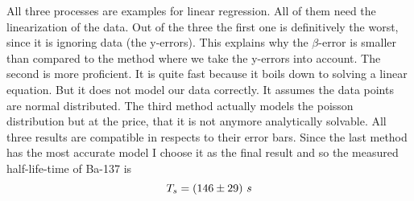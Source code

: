 \documentclass[11pt]{article}
\begin{document}
    All three processes are examples for linear regression.
    All of them need the linearization of the data.
    Out of the three the first one is definitively the worst, since it is ignoring data (the y-errors).
    This explains why the $\beta$-error is smaller than compared to the method where we take the y-errors into account.
    The second is more proficient.
    It is quite fast because it boils down to solving a linear equation.
    But it does not model our data correctly.
    It assumes the data points are normal distributed.
    The third method actually models the poisson distribution but at the price, that it is not anymore analytically 
    solvable.
    All three results are compatible in respects to their error bars.
    Since the last method has the most accurate model I choose it as the final result and so the measured half-life-time
    of Ba-137 is
    \begin{equation*}
        T_s = (146 \pm 29)\ s
    \end{equation*}
\end{document}
